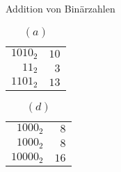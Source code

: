 \begin{solution}{Addition von Bin\"arzahlen}
\medskip

\begin{table}
\caption{$(a)$}
\begin{tabular}{r||r}
${1010}_2$ & $10$ \\
${11}_2$   & $3$  \\ \hline
${1101}_2$ & $13$
\end{tabular}
\end{table}

\begin{table}
\caption{$(d)$}
\begin{tabular}{r||r}
${1000}_2$  & $8$ \\
${1000}_2$  & $8$  \\ \hline
${10000}_2$ & $16$
\end{tabular}
\end{table}

\end{solution}
